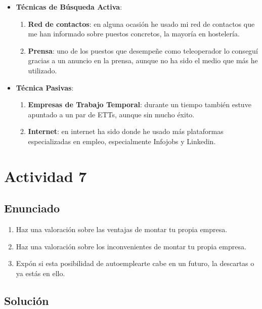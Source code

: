 \begin{itemize}
    \item \textbf{Técnicas de Búsqueda Activa}:
    \begin{enumerate}
        \item \textbf{Red de contactos}: en alguna ocasión he usado mi red de contactos que me han informado sobre puestos concretos, la mayoría en hostelería.
        \item \textbf{Prensa}: uno de los puestos que desempeñe como teleoperador lo conseguí gracias a un anuncio en la prensa, aunque no ha sido el medio que más he utilizado.
    \end{enumerate}
    \item \textbf{Técnica Pasivas}:
    \begin{enumerate}
        \item \textbf{Empresas de Trabajo Temporal}: durante un tiempo también estuve apuntado a un par de ETTs, aunque sin mucho éxito.
        \item \textbf{Internet}: en internet ha sido donde he usado más plataformas especializadas en empleo, especialmente Infojobs y Linkedin.
    \end{enumerate}
\end{itemize}

\section{Actividad 7}

\subsection{Enunciado}

\begin{enumerate}[label={\alph*}]
    \item Haz una valoración sobre las ventajas de montar tu propia empresa.
    \item Haz una valoración sobre los inconvenientes de montar tu propia empresa.
    \item Expón si esta posibilidad de autoemplearte cabe en un futuro, la descartas o ya estás en ello.
\end{enumerate}

\subsection{Solución}


